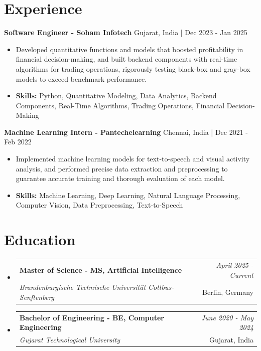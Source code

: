 \documentclass[a4paper,11pt]{article}
\makeatletter
\newcommand{\resumeSubheading}[4]{
\vspace{0.5mm}\item
    \begin{tabular*}{\linewidth}[t]{l@{\extracolsep{\fill}}r}
        \textbf{#1} & \textit{\footnotesize{#4}} \\
        \textit{\footnotesize{#3}} &  \footnotesize{#2}\\
    \end{tabular*}
    \vspace{-2.4mm}
}
\makeatother
\begin{document}
\section{\textbf{Experience}}


\vspace{1mm}
  \textbf{Software Engineer - Soham Infotech} \hfill Gujarat, India | Dec 2023 - Jan 2025
\vspace{-1.5mm} %
\begin{itemize}
  \item Developed quantitative functions and models that boosted profitability in financial decision-making, and built backend components with real-time algorithms for trading operations, rigorously testing black-box and gray-box models to exceed benchmark performance.

\vspace{-2mm}
  \item \textbf{Skills:} Python, Quantitative Modeling, Data Analytics, Backend Components, Real-Time Algorithms, Trading Operations, Financial Decision-Making
\end{itemize}

\vspace{1mm}
  \textbf{Machine Learning Intern - Pantechelearning} \hfill Chennai, India | Dec 2021 - Feb 2022
\vspace{-1.5mm} %
\begin{itemize}
  \item Implemented machine learning models for text-to-speech and visual activity analysis, and performed precise data extraction and preprocessing to guarantee accurate training and thorough evaluation of each model.
\vspace{-2mm}
  \item \textbf{Skills:} Machine Learning, Deep Learning, Natural Language Processing, Computer Vision, Data Preprocessing, Text-to-Speech
\end{itemize}\section{\textbf{Education}}
\vspace{-0.4mm}

\begin{itemize}[leftmargin=0.15in, label={}]
\resumeSubheading
{Master of Science - MS, Artificial Intelligence }{Berlin, Germany}
{Brandenburgische Technische Universität Cottbus-Senftenberg  }{April 2025 - Current}

\vspace{1.0mm} %
\resumeSubheading
{Bachelor of Engineering - BE, Computer Engineering  }{Gujarat, India}
{Gujarat Technological University }{June 2020 - May 2024}

\end{itemize}
\end{document}

